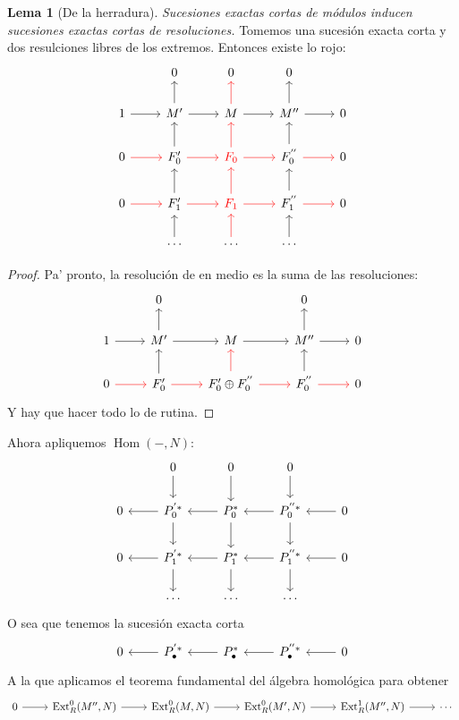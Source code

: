 \documentclass[spanish]{book}
\theoremstyle{definition}
\newtheorem*{lema}{Lema}
\DeclareMathOperator{\Hom}{Hom}
\DeclareMathOperator{\Ext}{Ext}
\begin{document}
\begin{lema}[De la herradura] \textit{Sucesiones exactas cortas de módulos inducen sucesiones exactas cortas de resoluciones.} Tomemos una sucesión exacta corta y dos resulciones libres de los extremos. Entonces existe lo rojo:
	\[\begin{tikzcd}
		&0&0&0\\
		1\arrow[r]&M'\arrow[u]\arrow[r]&M\arrow[red,u]\arrow[r]&M''\arrow[u]\arrow[r]&0\\
		0\arrow[red,r]&F_0'\arrow[r,red]\arrow[u]&\textcolor{red}{F_0}\arrow[r,red]\arrow[u,red]&F_0^{''}\arrow[u]\arrow[r,red]&0\\
		0\arrow[red,r]&F_1'\arrow[r,red]\arrow[u]&\textcolor{red}{F_1}\arrow[r,red]\arrow[u,red]&F_1^{''}\arrow[u]\arrow[r,red]&0\\
		&\cdots\arrow[u]&\cdots\arrow[u,red]&\cdots\arrow[u]&
	\end{tikzcd}\]
\end{lema}
\begin{proof} Pa' pronto, la resolución de en medio es la suma de las resoluciones:
	\[\begin{tikzcd}
		&0&&0\\
		1\arrow[r]&M'\arrow[r]\arrow[u]&M\arrow[r]&M''\arrow[r]\arrow[u]&0\\
		0\arrow[red,r]&F_0'\arrow[r,red]\arrow[u]&F_0'\oplus F_0^{''}\arrow[r,red]\arrow[u,red]&F_0^{''}\arrow[u]\arrow[r,red]&0
	\end{tikzcd}\]
	Y hay que hacer todo lo de rutina.
\end{proof}
Ahora apliquemos $\Hom(-,N)$:
\[\begin{tikzcd}
	&0\arrow[d]&0\arrow[d]&0\arrow[d]&\\
	0&P_0^{'*}\arrow[l]\arrow[d]&P_0^{*}\arrow[l]\arrow[d]&P_0^{''*}\arrow[l]\arrow[d]&0\arrow[l]\\	0&P_1^{'*}\arrow[l]\arrow[d]&P_1^{*}\arrow[l]\arrow[d]&P_1^{''*}\arrow[l]\arrow[d]&0\arrow[l]\\
	&\cdots&\cdots&\cdots&
\end{tikzcd}\]
O sea que tenemos la sucesión exacta corta
\[\begin{tikzcd}
	0&P^{'*}_\bullet\arrow[l]&P^*_\bullet\arrow[l]&P_\bullet^{''*}\arrow[l]&0\arrow[l]
\end{tikzcd}\]
A la que aplicamos el teorema fundamental del álgebra homológica para obtener
\[\begin{tikzcd}
	0\arrow[r]&\Ext_R^0(M'',N)\arrow[r]&\Ext_R^0(M,N)\arrow[r]&\Ext_R^0(M',N)\arrow[r]&\Ext_R^1(M'',N)\arrow[r]&\cdots
\end{tikzcd}\]
\end{document}
